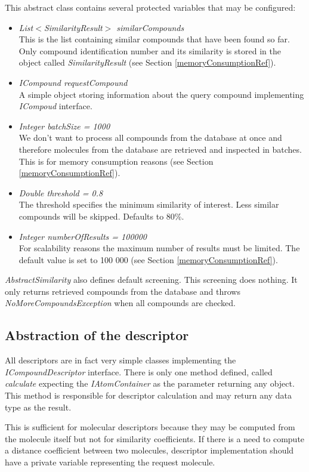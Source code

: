 \documentclass[thesis=M,english]{FITthesis}[2012/10/20]
\begin{document}
This abstract class contains several protected variables that may be configured:
\begin{itemize}
\item \textit{List$<$SimilarityResult$>$ similarCompounds} \\ This is the list containing similar compounds that have been found so far. Only compound identification number and its similarity is stored in the object called \textit{SimilarityResult} (see Section \ref{memoryConsumptionRef}).
\item \textit{ICompound requestCompound} \\ A simple object storing information about the query compound implementing \textit{ICompoud} interface.
\item \textit{Integer batchSize = 1000} \\ We don’t want to process all compounds from the database at once and therefore molecules from the database are retrieved and inspected in batches. This is for memory consumption reasons (see Section \ref{memoryConsumptionRef}).
\item \textit{Double threshold = 0.8} \\ The threshold specifies the minimum similarity of interest. Less similar compounds will be skipped. Defaults to 80\%.
\item \textit{Integer numberOfResults = 100000} \\ For scalability reasons the maximum number of results must be limited. The default value is set to 100 000 (see Section \ref{memoryConsumptionRef}).
\end{itemize}

\textit{AbstractSimilarity} also defines default screening. This screening does nothing. It only returns retrieved compounds from the database and throws \textit{NoMoreCompoundsException} when all compounds are checked.




\subsection{Abstraction of the descriptor}
All descriptors are in fact very simple classes implementing the \textit{ICompoundDescriptor} interface. There is only one method defined, called \textit{calculate} expecting the \textit{IAtomContainer} as the parameter returning any object. This method is responsible for descriptor calculation and may return any data type as the result.

This is sufficient for molecular descriptors because they may be computed from the molecule itself but not for similarity coefficients. If there is a need to compute a distance coefficient between two molecules, descriptor implementation should have a private variable representing the request molecule.
\end{document}
